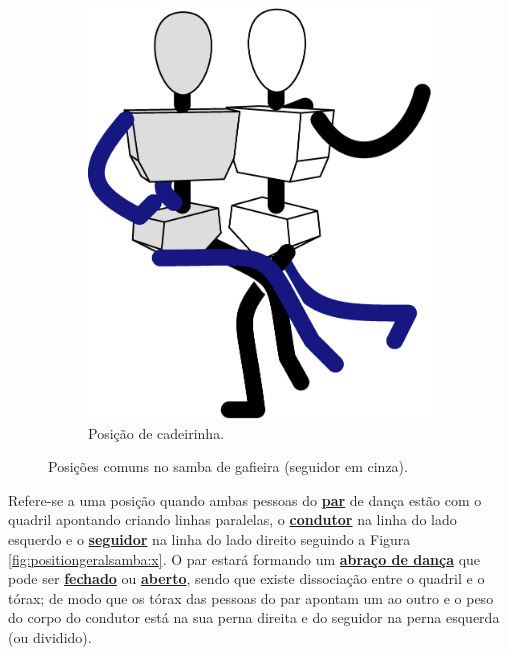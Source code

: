 \begin{figure}[!ht]
\begin{subfigure}[b]{0.295\textwidth}
         \includegraphics[width=\textwidth]{chapters/cap-normas/position-cadeirinha.eps}
         \caption{Posição de cadeirinha.}
         \label{fig:positiongeralsamba:cadeirinha}
     \end{subfigure}
\caption{Posições comuns no samba de gafieira (seguidor em cinza).}
\label{fig:positiongeralsamba}
\end{figure}

\begin{definition}[Posição de X]
\label{def:X-position} 
Refere-se a uma posição quando ambas pessoas do \hyperref[def:Par]{\textbf{par}} 
de dança estão com o quadril apontando criando linhas paralelas,
o \hyperref[def:Condutor]{\textbf{condutor}} na linha do lado esquerdo e
o \hyperref[def:Seguidor]{\textbf{seguidor}} na linha do lado direito seguindo a Figura \ref{fig:positiongeralsamba:x}.
O par estará formando um \hyperref[def:abracodedanca]{\textbf{abraço de dança}}
que pode ser \hyperref[def:closed-position]{\textbf{fechado}} 
ou \hyperref[def:open-position]{\textbf{aberto}},
sendo que existe dissociação entre o quadril e o tórax;
de modo que os tórax das pessoas do par apontam um ao outro e 
o peso do corpo do condutor está na sua perna direita e do seguidor na perna esquerda (ou dividido).
\end{definition}

